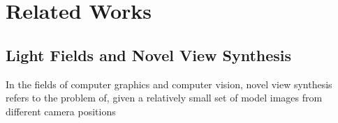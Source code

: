 \section{Related Works}

\subsection{Light Fields and Novel View Synthesis}
In the fields of computer graphics and computer vision, novel view synthesis refers to the problem of, given a relatively small set of model images from different camera positions